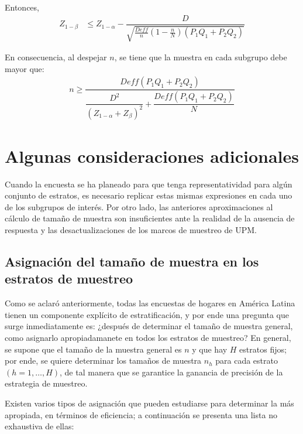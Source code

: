 \documentclass[
  10pt,
  spanish,
]{book}
\begin{document}
Entonces,
\begin{align*}
Z_{1-\beta}& \leq Z_{1-\alpha} - \dfrac{D}{\sqrt{\frac{Deff}{n}\left(1-\frac{n}{N}\right)(P_1Q_1+P_2Q_2)}} 
\end{align*}

En consecuencia, al despejar \(n\), se tiene que la muestra en cada subgrupo debe mayor que:
\begin{align}
n \geq \dfrac{Deff(P_1Q_1+P_2Q_2)}{\dfrac{D^2}{(Z_{1-\alpha}+Z_{\beta})^2}+\dfrac{Deff(P_1Q_1+P_2Q_2)}{N}}
 \end{align}

\hypertarget{algunas-consideraciones-adicionales}{%
\section{Algunas consideraciones adicionales}\label{algunas-consideraciones-adicionales}}

Cuando la encuesta se ha planeado para que tenga representatividad para algún conjunto de estratos, es necesario replicar estas mismas expresiones en cada uno de los subgrupos de interés. Por otro lado, las anteriores aproximaciones al cálculo de tamaño de muestra son insuficientes ante la realidad de la ausencia de respuesta y las desactualizaciones de los marcos de muestreo de UPM.

\hypertarget{asignaciuxf3n-del-tamauxf1o-de-muestra-en-los-estratos-de-muestreo}{%
\subsection{Asignación del tamaño de muestra en los estratos de muestreo}\label{asignaciuxf3n-del-tamauxf1o-de-muestra-en-los-estratos-de-muestreo}}

Como se aclaró anteriormente, todas las encuestas de hogares en América Latina tienen un componente explícito de estratificación, y por ende una pregunta que surge inmediatamente es: ¿después de determinar el tamaño de muestra general, como asignarlo apropiadamanete en todos los estratos de muestreo? En general, se supone que el tamaño de la muestra general es \(n\) y que hay \(H\) estratos fijos; por ende, se quiere determinar los tamaños de muestra \(n_h\) para cada estrato \((h = 1, \ldots, H)\), de tal manera que se garantice la ganancia de precisión de la estrategia de muestreo.

Existen varios tipos de asignación que pueden estudiarse para determinar la más apropiada, en términos de eficiencia; a continuación se presenta una lista no exhaustiva de ellas:
\end{document}

